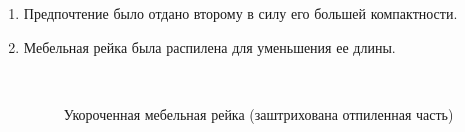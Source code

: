 \begin{enumerate}
\begin{enumerate}
\begin{enumerate}
      \end{enumerate}
      \item Предпочтение было отдано второму в силу его большей компактности.
      
      \item Мебельная рейка была распилена для уменьшения ее длины.
      
      \begin{figure}[H]
      	\begin{minipage}[h]{0.2\linewidth}
      		\center   
      	\end{minipage}
      	\begin{minipage}[h]{0.6\linewidth}
      		\caption{Укороченная мебельная рейка \newline (заштрихована отпиленная часть)}
      	\end{minipage}
      \end{figure}
      

\end{enumerate}
\end{enumerate}
